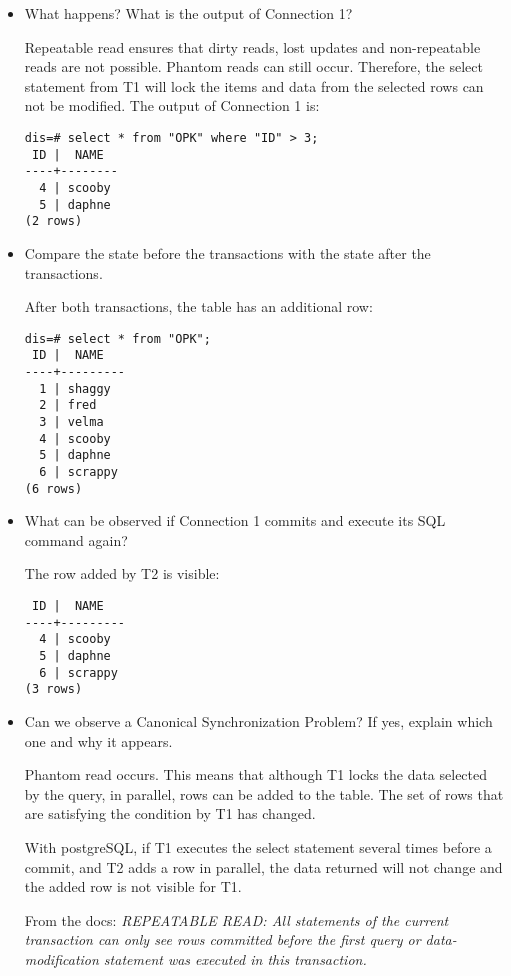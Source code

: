 \documentclass[ngerman]{dis-template-add}
\begin{document}
\begin{itemize}
\item What happens? What is the output of Connection 1?

Repeatable read ensures that dirty reads, lost updates and non-repeatable reads are not possible. Phantom reads can still occur.
Therefore, the select statement from T1 will lock the items and data from the selected rows can not be modified.
The output of Connection 1 is:

\begin{verbatim}
dis=# select * from "OPK" where "ID" > 3;
 ID |  NAME  
----+--------
  4 | scooby
  5 | daphne
(2 rows)
\end{verbatim}

\item Compare the state before the transactions with the state after the transactions.

After both transactions, the table has an additional row:

\begin{verbatim}
dis=# select * from "OPK";
 ID |  NAME   
----+---------
  1 | shaggy
  2 | fred
  3 | velma
  4 | scooby
  5 | daphne
  6 | scrappy
(6 rows)
\end{verbatim}

\item What can be observed if Connection 1 commits and execute its SQL command again?

The row added by T2 is visible:

\begin{verbatim}
 ID |  NAME   
----+---------
  4 | scooby
  5 | daphne
  6 | scrappy
(3 rows)
\end{verbatim}

\item Can we observe a Canonical Synchronization Problem? If yes, explain which one and why it appears.

Phantom read occurs. This means that although T1 locks the data selected by the query, in parallel, rows can be added to the table.
The set of rows that are satisfying the condition by T1 has changed.

With postgreSQL, if T1 executes the select statement several times before a commit, and T2 adds a row in parallel, the data returned will not change and the added row is not visible for T1.

From the docs: \textit{REPEATABLE READ: All statements of the current transaction can only see rows committed before the first query or data-modification statement was executed in this transaction.}
\end{itemize}
\end{document}
